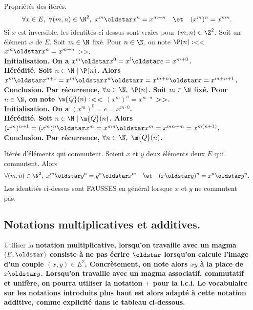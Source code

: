 \documentclass[11pt]{article}
\begin{document}
\begin{prop}{Propriétés des itérés.}{}
    \begin{equation*}
        \forall x \in E, ~ \forall (m,n) \in \N^2, ~ x^m \s x^n = x^{m+n} \quad \et \quad (x^m)^n = x^{mn}.
    \end{equation*}
    Si $x$ est inversible, les identités ci-dessus sont vraies pour $(m,n)\in\Z^2$.
    \tcblower
    Soit un élément $x$ de $E$.\n
    Soit $m\in\N$ fixé. Pour $n\in\N$, on note $\P(n):$<< $x^m\s x^n = x^{m+n}$ >>.\\
    \bf{Initialisation.} On a $x^m\s x^0 = x^l \s e = x^{m+0}$.\\
    \bf{Hérédité.} Soit $n\in\N \mid \P(n)$. Alors $x^m\s x^{n+1} = x^m \s x^n \s x = x^{m+n}\s x= x^{m+n+1}$.\\
    \bf{Conclusion.} Par récurrence, $\forall n\in\N, ~ \P(n)$.\n
    Soit $m\in\N$ fixé. Pour $n\in\N$, on note $\m{Q}(n):$<< $(x^m)^n=x^{m\cdot n}$ >>.\\
    \bf{Initialisation.} On a $(x^m)^0=e=x^{m\cdot0}$.\\
    \bf{Hérédité.} Soit $n\in\N\mid\m{Q}(n)$. Alors $(x^m)^{n+1}=(x^m)^n\s x^m = x^{mn}\s x^m = x^{mn+m} = x^{m(n+1)}$.\\
    \bf{Conclusion.} Par récurrence, $\forall n\in\N, ~ \m{Q}(n)$.
\end{prop}

\begin{ex}{Itérés d'éléments qui commutent.}{}
    Soient $x$ et $y$ deux éléments deux $E$ qui commutent. Alors
    \begin{equation*}
        \forall (m,n)\in\N^2, ~ x^m \s y^n = y^n \s x^m \quad\et\quad (x\s y)^n = x^n \s y^n.
    \end{equation*}
    \warning Les identités ci-dessus sont FAUSSES en général lorsque $x$ et $y$ ne commutent pas.
\end{ex}

\subsection{Notations multiplicatives et additives.}

\quad Utiliser la \bf{notation multiplicative}, lorsqu'on travaille avec un magma $(E,\s)$ consiste à ne pas écrire $\s$ lorsqu'on calcule l'image d'un couple $(x,y)\in E^2$. Concrètement, on note alors $xy$ à la place de $x\s y$.\n
\quad Lorsqu'on travaille avec un magma associatif, commutatif et unifère, on pourra utiliser la notation $+$ pour la l.c.i. Le vocabulaire sur les notations introduits plus haut est alors adapté à cette \bf{notation additive}, comme explicité dans le tableau ci-dessous.
\end{document}
